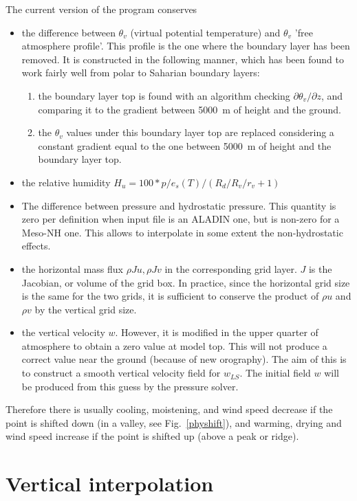 The current version of the program conserves
\begin{itemize}
\item
the difference between $\theta_v$ (virtual potential temperature)
and $\theta_v$ 'free atmosphere profile'.
This profile is the one where the boundary layer has been removed.
It is constructed in the following
manner, which has been found to work fairly well from polar to Saharian
boundary layers:
\begin{enumerate}
\item the boundary layer top is found with an algorithm checking
$\partial \theta_v / \partial z$, and comparing it to
the gradient between 5000~m of height and the ground.
\item the $\theta_v$ values under this boundary layer top are replaced
considering a constant gradient equal to the one between 5000~m of height
and the boundary layer top.
\end{enumerate}
\item
the relative humidity $H_u=100 * p/e_s(T)/(R_d/R_v/r_v + 1)$
\item
The difference between pressure and hydrostatic pressure.
This quantity is zero per definition when input file is an ALADIN one, but
is non-zero for a Meso-NH one. This allows to interpolate in some
extent the non-hydrostatic effects.
\item
the horizontal mass flux $\rho J u, \rho J v$
in the corresponding grid layer. $J$ is the Jacobian, or volume of the grid
box. In practice, since the horizontal grid size is the same for the two
grids, it is sufficient to conserve the product of $\rho u$ and $\rho v$
by the vertical grid size.
\item
the vertical velocity $w$. However, it is modified in the upper quarter
of atmosphere to obtain a zero value at model top.
This will not produce a correct value near the ground (because of new orography).
The aim of this is to construct a smooth vertical velocity field for
$w_{LS}$. The initial field $w$ will be produced from this
guess by the pressure solver.
\end{itemize}

Therefore there is usually cooling, moistening, and wind speed decrease
if the point is shifted down (in a valley, see Fig.~\ref{physhift}),
and warming, drying and wind speed increase if the point is shifted up
(above a peak or ridge).

\section{Vertical interpolation}

